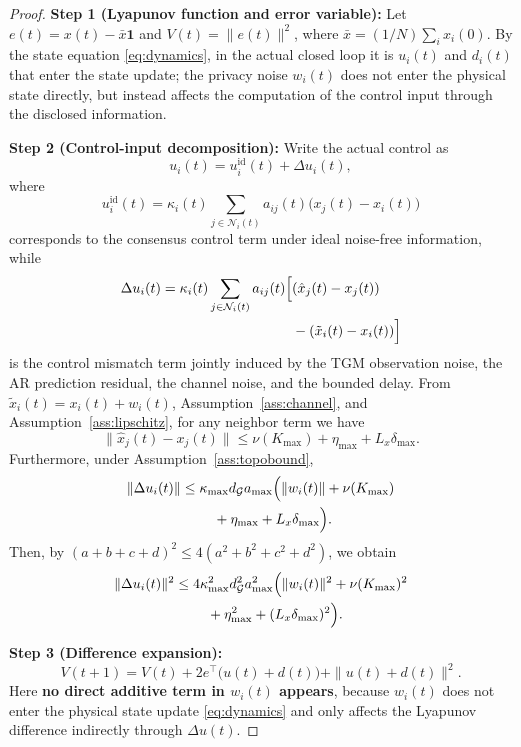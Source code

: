 \documentclass[10pt]{article}
\newcommand{\kmax}{\kappa_{\max}}
\newcommand{\amax}{a_{\max}}
\newcommand{\gdeg}{d_{\mathcal{G}}}
\begin{document}
\begin{proof}
\textbf{Step 1 (Lyapunov function and error variable):} Let $e(t)=x(t)-\bar{x}\mathbf{1}$ and $V(t)=\|e(t)\|^2$, where $\bar{x}=(1/N)\sum_i x_i(0)$. By the state equation \eqref{eq:dynamics}, in the actual closed loop it is $u_i(t)$ and $d_i(t)$ that enter the state update; the privacy noise $w_i(t)$ does not enter the physical state directly, but instead affects the computation of the control input through the disclosed information.

\textbf{Step 2 (Control-input decomposition):} Write the actual control as
\[
  u_i(t)=u_i^{\mathrm{id}}(t)+\Delta u_i(t),
\]
where
\[
  u_i^{\mathrm{id}}(t)=\kappa_i(t)\sum_{j\in\mathcal{N}_i(t)}a_{ij}(t)\bigl(x_j(t)-x_i(t)\bigr)
\]
corresponds to the consensus control term under ideal noise-free information, while
 \[
  \begin{aligned}
    \Delta u_i(t)=\kappa_i(t)\sum_{j\in\mathcal{N}_i(t)}a_{ij}(t)\Bigl[
      &(\hat{x}_j(t)-x_j(t))\\
      &-(\tilde{x}_i(t)-x_i(t))
    \Bigr]
  \end{aligned}
\]
is the control mismatch term jointly induced by the TGM observation noise, the AR prediction residual, the channel noise, and the bounded delay. From $\tilde{x}_i(t)=x_i(t)+w_i(t)$, Assumption~\ref{ass:channel}, and Assumption~\ref{ass:lipschitz}, for any neighbor term we have
\[
  \|\hat{x}_j(t)-x_j(t)\| \leq \nu(K_{\max})+\eta_{\max}+L_x\delta_{\max}.
\]
Furthermore, under Assumption~\ref{ass:topobound},
\[
  \begin{aligned}
    \|\Delta u_i(t)\|
    \leq {}& \kmax\gdeg\amax\Bigl(
      \|w_i(t)\|+\nu(K_{\max}) \\
      &\quad {}+\eta_{\max}+L_x\delta_{\max}
    \Bigr).
  \end{aligned}
\]
Then, by $(a+b+c+d)^2\leq4(a^2+b^2+c^2+d^2)$, we obtain
\[
  \begin{aligned}
    \|\Delta u_i(t)\|^2
    \leq {}& 4\kmax^2\gdeg^2\amax^2 \Bigl(
      \|w_i(t)\|^2+\nu(K_{\max})^2 \\
      &\quad {}+\eta_{\max}^2+(L_x\delta_{\max})^2
    \Bigr).
  \end{aligned}
\]

\textbf{Step 3 (Difference expansion):}
\[
  V(t+1) = V(t) + 2e^\top\!\bigl(u(t)+d(t)\bigr) + \|u(t)+d(t)\|^2.
\]
Here \textbf{no direct additive term in $w_i(t)$ appears}, because $w_i(t)$ does not enter the physical state update \eqref{eq:dynamics} and only affects the Lyapunov difference indirectly through $\Delta u(t)$.


\end{proof}
\end{document}
